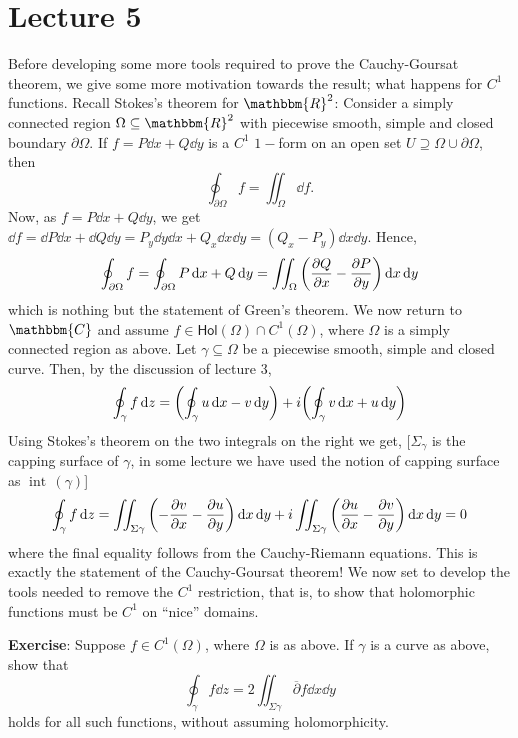 \documentclass[../ComplexAnalysis_Notes.tex]{subfiles}
\begin{document}
\chapter*{Lecture 5} %
\setcounter{chapter}{5} %
\setcounter{section}{0}
\setcounter{equation}{0}
\setcounter{figure}{0}

Before developing some more tools required to prove the Cauchy-Goursat theorem, we give some more motivation towards the result; what happens for \( C^1 \) functions. Recall Stokes's theorem for \( \mathbbm{R}^2 \): Consider a simply connected region \( \Omega \subseteq \mathbbm{R}^2 \) with piecewise smooth, simple and closed boundary \( \partial \Omega \). If \( f = P \dd{x} + Q \dd{y} \) is a \( C^1 \) \( 1- \)form on an open set \( U \supseteq \Omega \cup \partial \Omega  \), then
\[ 
 \oint_{\partial \Omega} f = \iint_{\Omega}\dd{f}.
 \]
Now, as \( f = P \dd{x} + Q \dd{y} \), we get \( \dd{f} = \dd{P} \dd{x} + \dd{Q} \dd{y} = P_y \dd{y}\dd{x} + Q_x \dd{x}\dd{y} = (Q_x-P_y)\dd{x}\dd{y} \). Hence,
\[ 
  \oint_{\partial \Omega} f = \oint_{\partial \Omega} P \dd{x} + Q \dd{y} = \iint_\Omega \qty(\pdv{Q}{x} - \pdv{P}{y}) \dd{x} \dd{y}
 \]
which is nothing but the statement of Green's theorem. We now return to \( \mathbbm{C} \) and assume \( f \in \textsf{Hol}(\Omega) \cap C^1(\Omega) \), where \( \Omega \) is a simply connected region as above. Let \( \gamma \subseteq \Omega \) be a piecewise smooth, simple and closed curve. Then, by the discussion of lecture 3,
\[ 
 \oint_\gamma f \dd{z} = \qty(\oint_\gamma u \dd{x} - v \dd{y}) + i\qty(\oint_\gamma v \dd{x} + u \dd{y}) 
 \]
 Using Stokes's theorem on the two integrals on the right we get, [$\Sigma_{\gamma}$ is the capping surface of $\gamma$, in some lecture we have used the notion of capping surface as $\operatorname{int}\, (\gamma)$]
 \[ 
  \oint_\gamma f \dd{z} = \iint_{\Sigma \gamma} \qty(-\pdv{v}{x}-\pdv{u}{y})\dd{x}\dd{y} + i \iint_{\Sigma \gamma} \qty(\pdv{u}{x}-\pdv{v}{y})\dd{x}\dd{y} = 0
  \]
  where the final equality follows from the Cauchy-Riemann equations. This is exactly the statement of the Cauchy-Goursat theorem! We now set to develop the tools needed to remove the \( C^1 \) restriction, that is, to show that holomorphic functions must be \( C^1 \) on ``nice'' domains.

\textbf{Exercise}: Suppose \( f \in C^1(\Omega) \), where \( \Omega \) is as above. If \( \gamma \) is a curve as above, show that
\[ 
 \oint_\gamma f \dd{z} = 2 \iint_{\Sigma \gamma} \overline{\partial}f \dd{x}\dd{y}
 \]
holds for all such functions, without assuming holomorphicity.
\medskip
\end{document}
